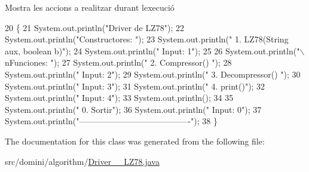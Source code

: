 Mostra les accions a realitzar durant l\textquotesingle{}execució 


\begin{DoxyCode}
20                                      \{
21         System.out.println(\textcolor{stringliteral}{"Driver de LZ78"});
22         System.out.println(\textcolor{stringliteral}{"Constructores: "});
23         System.out.println(\textcolor{stringliteral}{"     1. LZ78(String aux, boolean b)"});
24         System.out.println(\textcolor{stringliteral}{"     Input: 1"});
25 
26         System.out.println(\textcolor{stringliteral}{"\(\backslash\)nFunciones: "});
27         System.out.println(\textcolor{stringliteral}{"     2. Compressor() "});
28         System.out.println(\textcolor{stringliteral}{"     Input: 2"});
29         System.out.println(\textcolor{stringliteral}{"     3. Decompressor() "});
30         System.out.println(\textcolor{stringliteral}{"     Input: 3"});
31         System.out.println(\textcolor{stringliteral}{"     4. print()"});
32         System.out.println(\textcolor{stringliteral}{"     Input: 4"});
33         System.out.println();
34 
35         System.out.println(\textcolor{stringliteral}{"     0. Sortir"});
36         System.out.println(\textcolor{stringliteral}{"     Input: 0"});
37         System.out.println(\textcolor{stringliteral}{"----------------------------------------"});
38     \}
\end{DoxyCode}


The documentation for this class was generated from the following file\+:\begin{DoxyCompactItemize}
\item 
src/domini/algorithm/\hyperlink{Driver____LZ78_8java}{Driver\+\_\+\+\_\+\+L\+Z78.\+java}\end{DoxyCompactItemize}
